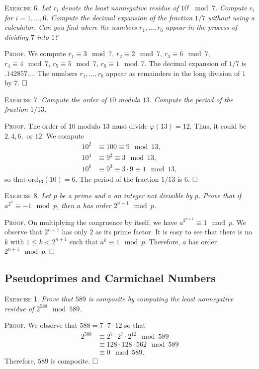 \documentclass[11pt, leqno]{article}
\newcommand{\done}{\ensuremath{\hfill\square}}
\begin{document}
\textsc{Exercise 6}. \emph{Let $r_i$ denote the least nonnegative residue of $10^i \mod 7$. Compute $r_i$ for $i=1,\ldots,6$. Compute the decimal expansion of the fraction $1/7$ without using a calculator. Can you find where the numbers $r_1, \ldots, r_6$ appear in the process of dividing $7$ into $1$?}

\textsc{Proof}. We compute $r_1 \equiv 3 \mod 7$, $r_2 \equiv 2 \mod 7$, $r_3 \equiv 6 \mod 7$, $r_4 \equiv 4 \mod 7$, $r_5 \equiv 5 \mod 7$, $r_6 \equiv 1 \mod 7$. The decimal expansion of $1/7$ is $.142857...$. The numbers $r_1, \ldots, r_6$ appear as remainders in the long division of $1$ by $7$. \done

\textsc{Exercise 7}. \emph{Compute the order of $10$ modulo $13$. Compute the period of the fraction $1/13$.}

\textsc{Proof}. The order of $10$ modulo $13$ must divide $\varphi(13) = 12$. Thus, it could be $2, 4, 6, $ or $12$. We compute 
\begin{align*}
  10^2 &\equiv 100 \equiv 9 \mod 13, \\
  10^4 &\equiv 9^2 \equiv 3 \mod 13, \\
  10^6 &\equiv 9^3 \equiv 3\cdot 9 \equiv 1 \mod 13,
\end{align*}
so that ord$_{13}(10) = 6$. The period of the fraction $1/13$ is 6. \done

\textsc{Exercise 8}. \emph{Let $p$ be a prime and $a$ an integer not divisible by $p$. Prove that if $a^{2^n}\equiv -1 \mod p$, then $a$ has order $2^{n+1} \mod p$.}

\textsc{Proof}. On multiplying the congruence by itself, we have $a^{2^{n+1}} \equiv 1 \mod p$. We observe that $2^{n+1}$ has only $2$ as its prime factor. It is easy to see that there is no $k$ with $1\leq k < 2^{n+1}$ such that $a^k \equiv 1 \mod p$. Therefore, $a$ has order $2^{n+1}\mod p$. \done

\subsection{Pseudoprimes and Carmichael Numbers}

\textsc{Exercise 1}. \emph{Prove that $589$ is composite by computing the least nonnegative residue of $2^{588} \mod 589$.}

\textsc{Proof}. We observe that $588 = 7\cdot 7 \cdot 12$ so that 
\begin{align*}
  2^{588} &\equiv 2^7\cdot 2^7 \cdot 2^{12} \mod 589 \\
          &\equiv 128 \cdot 128 \cdot 562 \mod 589 \\
          &\equiv 0 \mod 589.
\end{align*}
Therefore, $589$ is composite. \done
\end{document}
